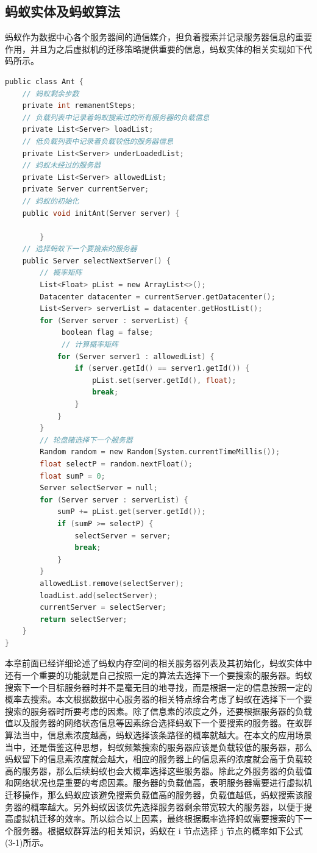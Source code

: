 \subsection{蚂蚁实体及蚂蚁算法}
蚂蚁作为数据中心各个服务器间的通信媒介，担负着搜索并记录服务器信息的重要作用，并且为之后虚拟机的迁移策略提供重要的信息，蚂蚁实体的相关实现如下代码所示。

\begin{lstlisting}[language=C,caption={蚂蚁实体},label=Code:java]
public class Ant {
    // 蚂蚁剩余步数
    private int remanentSteps;
    // 负载列表中记录着蚂蚁搜索过的所有服务器的负载信息
    private List<Server> loadList;
    // 低负载列表中记录着负载较低的服务器信息
    private List<Server> underLoadedList;
    // 蚂蚁未经过的服务器
    private List<Server> allowedList;
    private Server currentServer;
    // 蚂蚁的初始化
    public void initAnt(Server server) {
            
        }
    // 选择蚂蚁下一个要搜索的服务器
    public Server selectNextServer() {
        // 概率矩阵
        List<Float> pList = new ArrayList<>();
        Datacenter datacenter = currentServer.getDatacenter();
        List<Server> serverList = datacenter.getHostList();
        for (Server server : serverList) {
             boolean flag = false;
             // 计算概率矩阵
            for (Server server1 : allowedList) {
                if (server.getId() == server1.getId()) {
                    pList.set(server.getId(), float);
                    break;
                }
            }
        }
        // 轮盘赌选择下一个服务器
        Random random = new Random(System.currentTimeMillis());
        float selectP = random.nextFloat();
        float sumP = 0;
        Server selectServer = null;
        for (Server server : serverList) {
            sumP += pList.get(server.getId());
            if (sumP >= selectP) {
                selectServer = server;
                break;
            }
        }
        allowedList.remove(selectServer);
        loadList.add(selectServer);
        currentServer = selectServer;
        return selectServer;
    }
}
\end{lstlisting}

本章前面已经详细论述了蚂蚁内存空间的相关服务器列表及其初始化，蚂蚁实体中还有一个重要的功能就是自己按照一定的算法去选择下一个要搜索的服务器。蚂蚁搜索下一个目标服务器时并不是毫无目的地寻找，而是根据一定的信息按照一定的概率去搜索。本文根据数据中心服务器的相关特点综合考虑了蚂蚁在选择下一个要搜索的服务器时所要考虑的因素。除了信息素的浓度之外，还要根据服务器的负载值以及服务器的网络状态信息等因素综合选择蚂蚁下一个要搜索的服务器。在蚁群算法当中，信息素浓度越高，蚂蚁选择该条路径的概率就越大。在本文的应用场景当中，还是借鉴这种思想，蚂蚁频繁搜索的服务器应该是负载较低的服务器，那么蚂蚁留下的信息素浓度就会越大，相应的服务器上的信息素的浓度就会高于负载较高的服务器，那么后续蚂蚁也会大概率选择这些服务器。除此之外服务器的负载值和网络状况也是重要的考虑因素。服务器的负载值高，表明服务器需要进行虚拟机迁移操作，那么蚂蚁应该避免搜索负载值高的服务器，负载值越低，蚂蚁搜索该服务器的概率越大。另外蚂蚁因该优先选择服务器剩余带宽较大的服务器，以便于提高虚拟机迁移的效率。所以综合以上因素，最终根据概率选择蚂蚁需要搜索的下一个服务器。根据蚁群算法的相关知识，蚂蚁在 i 节点选择 j 节点的概率如下公式(3-1)所示。

